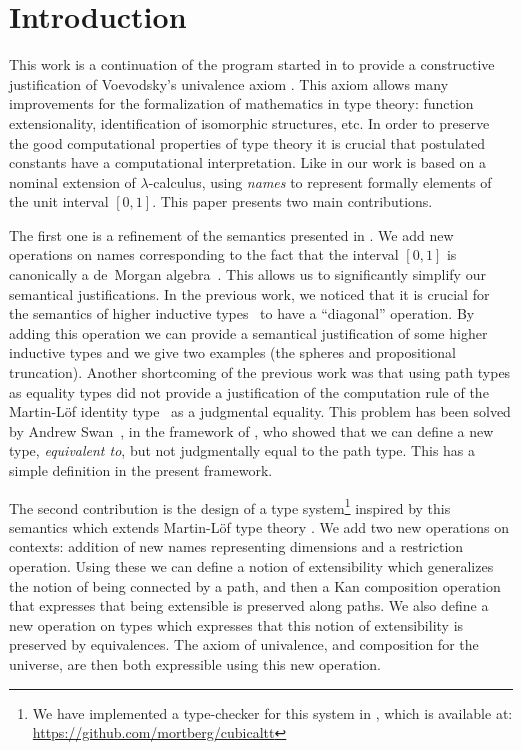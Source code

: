\section{Introduction}\label{sec:introduction}

This work is a continuation of the program started in
\cite{BCH,simonlic} to provide a constructive justification of
Voevodsky's univalence axiom \cite{Voevodsky}. This axiom allows many
improvements for the formalization of mathematics in type theory:
function extensionality, identification of isomorphic structures,
etc. In order to preserve the good computational properties of type
theory it is crucial that postulated constants have a computational
interpretation. Like in \cite{BCH,simonlic,Pitts} our work is based on
a nominal extension of $\lambda$-calculus, using {\em names} to
represent formally elements of the unit interval $[0,1]$. This paper
presents two main contributions.

The first one is a refinement of the semantics presented in
\cite{BCH,simonlic}.  We add new operations on names corresponding to
the fact that the interval $[0,1]$ is canonically a de~Morgan
algebra~\cite{Balbes}.  This allows us to significantly simplify our
semantical justifications. In the previous work, we noticed that it is
crucial for the semantics of higher inductive types~\cite{hott-book}
to have a ``diagonal'' operation. By adding this operation we can
provide a semantical justification of some higher inductive types and
we give two examples (the spheres and propositional
truncation). Another shortcoming of the previous work was that using
path types as equality types did not provide a justification of the
computation rule of the Martin-L\"of identity type~\cite{ML75} as a
judgmental equality. This problem has been solved by
Andrew Swan~\cite{Swan}, in the framework of \cite{BCH,simonlic,Pitts},
who showed that we can define a new type, {\em equivalent to}, but not
judgmentally equal to the path type. This has a simple definition in
the present framework.

The second contribution is the design of a type system\footnote{We
  have implemented a type-checker for this system in \Haskell{}, which
  is available at:\\ \url{https://github.com/mortberg/cubicaltt}}
inspired by this semantics which extends Martin-L\"of type theory
\cite{MLTT72,ML75}. We add two new operations on contexts: addition of
new names representing dimensions and a restriction operation. Using
these we can define a notion of extensibility which generalizes the
notion of being connected by a path, and then a Kan composition
operation that expresses that being extensible is preserved along
paths.  We also define a new operation on types which expresses that
this notion of extensibility is preserved by equivalences. The axiom
of univalence, and composition for the universe, are then both
expressible using this new operation.

